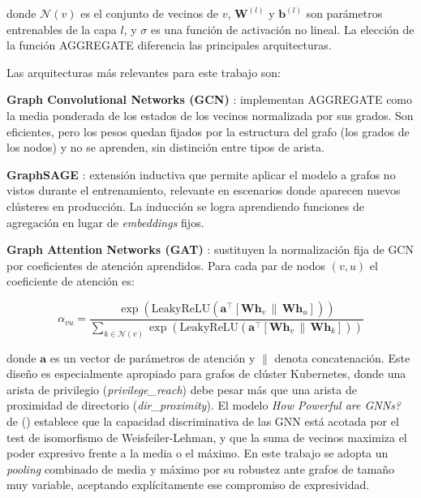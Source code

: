 donde \(\mathcal{N}(v)\) es el conjunto de vecinos de \(v\), \(\mathbf{W}^{(l)}\) y
\(\mathbf{b}^{(l)}\) son parámetros entrenables de la capa \(l\), y \(\sigma\) es una
función de activación no lineal. La elección de la función AGGREGATE diferencia las
principales arquitecturas.

Las arquitecturas más relevantes para este trabajo son:

\textbf{Graph Convolutional Networks (\acs{GCN})} \citep{Kipf2017}: implementan AGGREGATE
como la media ponderada de los estados de los vecinos normalizada por sus grados.
Son eficientes, pero los pesos quedan fijados por la estructura del grafo (los grados
de los nodos) y no se aprenden, sin distinción entre tipos de arista.

\textbf{GraphSAGE} \citep{Hamilton2017}: extensión inductiva que permite aplicar el
modelo a grafos no vistos durante el entrenamiento, relevante en escenarios donde
aparecen nuevos clústeres en producción. La inducción se logra aprendiendo funciones
de agregación en lugar de \textit{embeddings} fijos.

\textbf{Graph Attention Networks (\acs{GAT})} \citep{Velickovic2018}: sustituyen la
normalización fija de \acs{GCN} por coeficientes de atención aprendidos. Para cada par
de nodos \((v, u)\) el coeficiente de atención es:

\begin{equation}
  \alpha_{vu} = \frac{
    \exp\!\left( \text{LeakyReLU}\!\left(
      \mathbf{a}^\top [\mathbf{W}\mathbf{h}_v \,\|\, \mathbf{W}\mathbf{h}_u]
    \right) \right)
  }{
    \sum_{k \in \mathcal{N}(v)} \exp\!\left( \text{LeakyReLU}\!\left(
      \mathbf{a}^\top [\mathbf{W}\mathbf{h}_v \,\|\, \mathbf{W}\mathbf{h}_k]
    \right) \right)
  }
  \label{eq:gat_attn}
\end{equation}

donde \(\mathbf{a}\) es un vector de parámetros de atención y \(\|\) denota
concatenación. Este diseño es especialmente apropiado para grafos de clúster
Kubernetes, donde una arista de privilegio (\textit{privilege\_reach})
debe pesar más que una arista de proximidad de directorio (\textit{dir\_proximity}).
El modelo \textit{How Powerful are \acs{GNN}s?} de \citeauthor{Xu2019} (\citeyear{Xu2019})
establece que la capacidad discriminativa de las \acs{GNN} está acotada por el test de
isomorfismo de Weisfeiler-Lehman, y que la suma de vecinos maximiza el poder
expresivo frente a la media o el máximo. En este trabajo se adopta un
\textit{pooling} combinado de media y máximo por su robustez ante grafos de tamaño
muy variable, aceptando explícitamente ese compromiso de expresividad.

